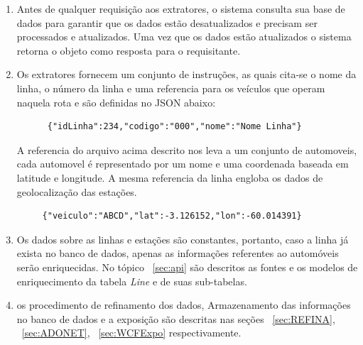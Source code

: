 \documentclass[12pt]{article}
\begin{document}
\begin{enumerate}
\item Antes de qualquer requisição aos extratores, o sistema consulta sua base de dados para garantir que os dados estão desatualizados e precisam ser processados e atualizados. Uma vez que os dados estão atualizados o sistema retorna o objeto como resposta para o requisitante.\\

\item Os extratores fornecem um conjunto de instruções, as quais cita-se o nome da linha, o número da linha e uma referencia para os veículos que operam naquela rota e são definidas no JSON abaixo:

\begin{lstlisting}
      {"idLinha":234,"codigo":"000","nome":"Nome Linha"}
\end{lstlisting}
A referencia do arquivo acima descrito nos leva a um conjunto de automoveis, cada automovel é representado por um nome e uma coordenada baseada em latitude e longitude. A mesma referencia da linha engloba os dados de geolocalização  das estações.
\begin{lstlisting}
     {"veiculo":"ABCD","lat":-3.126152,"lon":-60.014391}
\end{lstlisting}

\item Os dados sobre as linhas e estações são constantes, portanto, caso a linha já exista no banco de dados, apenas as informações referentes ao automóveis serão enriquecidas. No tópico ~\ref{sec:api} são descritos as fontes e os modelos de enriquecimento da tabela \textit{Line} e de suas sub-tabelas.\\

\item os procedimento de refinamento dos dados, Armazenamento das informações no banco de dados e a exposição são descritas nas seções ~\ref{sec:REFINA},  ~\ref{sec:ADONET}, ~\ref{sec:WCFExpo} respectivamente.
\end{enumerate}
\end{document}
